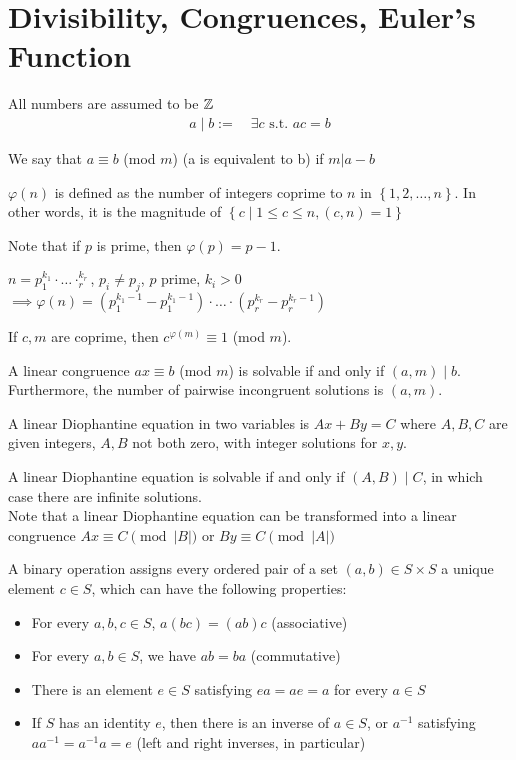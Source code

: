 \documentclass{memoir}
\begin{document}
\chapter{Divisibility, Congruences, Euler's Function}
All numbers are assumed to be \(\mathbb{Z}\)\\
\begin{align*}
	a\mid b := \quad \exists c \text{ s.t. } ac = b
\end{align*}
\begin{defn}
	We say that \(a \equiv b\) (mod \(m\)) (a is equivalent to b)  if \(m|a-b\) 
\end{defn}
\begin{defn}
	\(\varphi(n)\) is defined as the number of integers coprime to \(n\) in \(\left\{ 1,2,\ldots,n \right\} \). In other words, it is the magnitude of \(\left\{ c \mid 1\leq c\leq n, (c,n) = 1 \right\} \)
\end{defn}
Note that if \(p\) is prime, then \(\varphi(p) = p-1\).
\begin{thm}
	\(n = p_1^{k_1}\cdot\ldots\cdotp_r^{k_r}\), \(p_i \neq p_j\), \(p\) prime, \(k_i > 0\) \(\implies \varphi(n) = (p_1^{k_1-1}-p_1^{k_1-1})\cdot\ldots\cdot (p_r^{k_r}-p_r^{k_r-1})\)
\end{thm}
\begin{thm}
	If \(c,m\) are coprime, then \(c^{\varphi(m)} \equiv 1\) (mod \(m\)).
\end{thm}
\begin{thm}
	A linear congruence \(ax \equiv b\) (mod \(m\)) is solvable if and only if \((a,m) \mid b\). Furthermore, the number of pairwise incongruent solutions is \((a,m)\).
\end{thm}
\begin{defn}
	A linear Diophantine equation in two variables is \(Ax+By=C\) where \(A,B,C\) are given integers, \(A,B\) not both zero, with integer solutions for  \(x,y \).
\end{defn}
A linear Diophantine equation is solvable if and only if \((A,B)\mid C\), in which case there are infinite solutions.\\
Note that a linear Diophantine equation can be transformed into a linear congruence \(Ax \equiv C \pmod {\left| B \right|}\) or \(By \equiv C \pmod {\left| A \right|} \)
\begin{defn}
	A binary operation assigns every ordered pair of a set \((a,b)\in S\times S\) a unique element \(c \in S\), which can have the following properties:
	\begin{itemize}
		\item For every \(a,b,c \in S\), \(a(bc) = (ab)c\) (associative)
		\item For every \(a,b \in S\), we have \(ab = ba\) (commutative)
		\item There is an element \(e \in S\) satisfying \(ea  = ae = a\) for every \(a \in S\) 
		\item If \(S\) has an identity \(e\), then there is an inverse of \(a \in S\), or \(a^{-1}\) satisfying \(aa^{-1} = a^{-1}a = e\) (left and right inverses, in particular)
	\end{itemize}
\end{defn}
\end{document}

